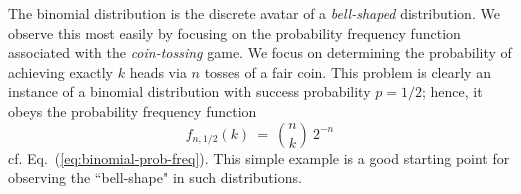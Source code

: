 \bigskip

 

The binomial distribution is the discrete avatar of a {\em bell-shaped} distribution.  We observe this most easily by focusing on the probability frequency function associated with the {\em coin-tossing} game.  We focus on determining the probability of achieving exactly $k$ {\sc head}s via $n$ tosses of a fair coin.  This problem is clearly an instance of a binomial distribution with success probability $p = 1/2$; hence, it obeys the probability frequency function 
\[ f_{n,1/2}(k) \ = \  {n \choose k} \ 2^{-n} \] 
cf. Eq.~(\ref{eq:binomial-prob-freq}).  This simple example is a good starting point for observing the ``bell-shape" in such distributions.

\smallskip

